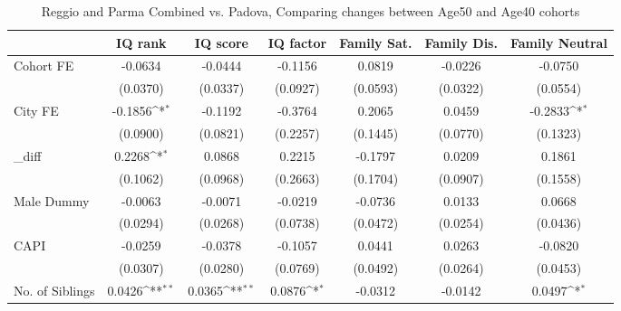 \begin{table}[htbp]\centering
\def\sym#1{\ifmmode^{#1}\else\(^{#1}\)\fi}
\caption{Reggio and Parma Combined vs. Padova, Comparing changes between Age50 and Age40 cohorts}
\begin{tabular}{l*{6}{c}}
\toprule
            &\multicolumn{1}{c}{IQ rank}&\multicolumn{1}{c}{IQ score}&\multicolumn{1}{c}{IQ factor}&\multicolumn{1}{c}{Family Sat.}&\multicolumn{1}{c}{Family Dis.}&\multicolumn{1}{c}{Family Neutral}\\
\midrule
Cohort FE   &     -0.0634         &     -0.0444         &     -0.1156         &      0.0819         &     -0.0226         &     -0.0750         \\
            &    (0.0370)         &    (0.0337)         &    (0.0927)         &    (0.0593)         &    (0.0322)         &    (0.0554)         \\
\addlinespace
City FE     &     -0.1856\sym{*}  &     -0.1192         &     -0.3764         &      0.2065         &      0.0459         &     -0.2833\sym{*}  \\
            &    (0.0900)         &    (0.0821)         &    (0.2257)         &    (0.1445)         &    (0.0770)         &    (0.1323)         \\
\addlinespace
\_diff       &      0.2268\sym{*}  &      0.0868         &      0.2215         &     -0.1797         &      0.0209         &      0.1861         \\
            &    (0.1062)         &    (0.0968)         &    (0.2663)         &    (0.1704)         &    (0.0907)         &    (0.1558)         \\
\addlinespace
Male Dummy  &     -0.0063         &     -0.0071         &     -0.0219         &     -0.0736         &      0.0133         &      0.0668         \\
            &    (0.0294)         &    (0.0268)         &    (0.0738)         &    (0.0472)         &    (0.0254)         &    (0.0436)         \\
\addlinespace
CAPI        &     -0.0259         &     -0.0378         &     -0.1057         &      0.0441         &      0.0263         &     -0.0820         \\
            &    (0.0307)         &    (0.0280)         &    (0.0769)         &    (0.0492)         &    (0.0264)         &    (0.0453)         \\
\addlinespace
No. of Siblings&      0.0426\sym{**} &      0.0365\sym{**} &      0.0876\sym{*}  &     -0.0312         &     -0.0142         &      0.0497\sym{*}  \\

\end{tabular}
\end{table}
